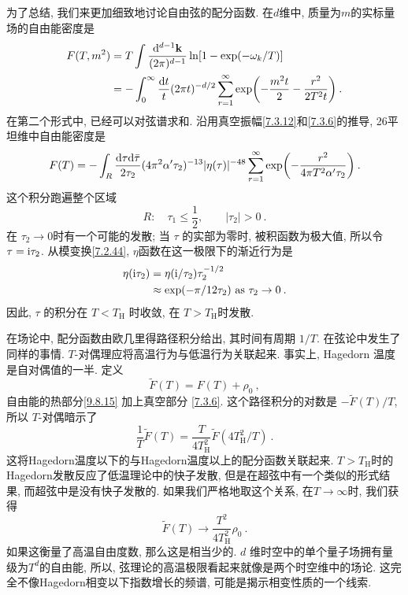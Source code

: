 为了总结, 我们来更加细致地讨论自由弦的配分函数. 在$d$维中, 质量为$m$的实标量场的自由能密度是
\begin{align}
	F(T, m^{2}) &= T \int \frac{\mathrm{d}^{d-1} \mathbf{k}}{(2 \pi)^{d-1}} \ln [1-\exp(-\omega_{k} / T)] \nonumber \\
				&= - \int_{0}^{\infty} \frac{\mathrm{d} t}{t}(2 \pi t)^{-d / 2} \sum_{r=1}^{\infty}
				    \exp \biggl(-\frac{m^{2} t}{2}-\frac{r^{2}}{2 T^{2} t}\biggr) \:. \label{9.8.14}
\end{align}
在第二个形式中, 已经可以对弦谱求和. 沿用真空振幅\eqref{7.3.12}和\eqref{7.3.6}的推导, 26平坦维中自由能密度是
\begin{equation}
	F(T)=-\int_{R} \frac{\mathrm{d} \tau \mathrm{d} \bar{\tau}}{2 \tau_{2}} (4 \pi^{2} \alpha^{\prime} \tau_{2})^{-13}|\eta(\tau)|^{-48} 
	\sum_{r=1}^{\infty} \exp \biggl(-\frac{r^{2}}{4 \pi T^{2} \alpha^{\prime} \tau_{2}}\biggr) \:. \label{9.8.15}
\end{equation}
这个积分跑遍整个区域
\begin{equation}
	R: \quad \tau_{1} \leq \frac{1}{2}, \qquad |\tau_{2}|>0 \:. \label{9.8.16}
\end{equation}
在 $\tau_{2} \rightarrow 0 $时有一个可能的发散; 当 $\tau$ 的实部为零时, 被积函数为极大值, 所以令 $\tau=\mathrm{i} \tau_{2}$. 
从模变换\eqref{7.2.44}, $\eta$函数在这一极限下的渐近行为是
\begin{align}
	\eta(\mathrm{i} \tau_{2}) &= \eta(\mathrm{i} / \tau_{2}) \tau_{2}^{-1/2} \nonumber \\
	& \approx \exp (-\pi / 12 \tau_{2}) \text { as } \tau_{2} \rightarrow 0 \:. \label{9.8.17}
\end{align}
因此,  $\tau$ 的积分在 $T<T_{\mathrm{H}}$ 时收敛, 在 $T>T_{\mathrm{H}}$时发散.

在场论中, 配分函数由欧几里得路径积分给出, 其时间有周期 $1 / T$. 在弦论中发生了同样的事情. $T$-对偶理应将高温行为与低温行为关联起来. 
事实上, Hagedorn 温度是自对偶值的一半. 定义
\begin{equation}
	\tilde{F}(T)=F(T)+\rho_{0} \:, \label{9.8.18}
\end{equation}
自由能的热部分\eqref{9.8.15} 加上真空部分 \eqref{7.3.6}. 这个路径积分的对数是 $-\tilde{F}(T) / T$, 所以 $T$-对偶暗示了
\begin{equation}
	\frac{1}{T} \tilde{F}(T)=\frac{T}{4 T_{\mathrm{H}}^{2}} \tilde{F}(4 T_{\mathrm{H}}^{2} / T) \:. \label{9.8.19}
\end{equation}
这将Hagedorn温度以下的与Hagedorn温度以上的配分函数关联起来. $T>T_{\mathrm{H}}$时的Hagedorn发散反应了低温理论中的快子发散, 
但是在超弦中有一个类似的形式结果, 而超弦中是没有快子发散的. 如果我们严格地取这个关系, 在$T \rightarrow \infty $时, 我们获得
\begin{equation}
	\tilde{F}(T) \rightarrow \frac{T^{2}}{4 T_{\mathrm{H}}^{2}} \rho_{0} \:. \label{9.8.20}
\end{equation}
如果这衡量了高温自由度数, 那么这是相当少的.  $d$ 维时空中的单个量子场拥有量级为$T^{d}$的自由能, 所以, 弦理论的高温极限看起来就像是两个时空维中的场论. 
这完全不像Hagedorn相变以下指数增长的频谱, 可能是揭示相变性质的一个线索.

